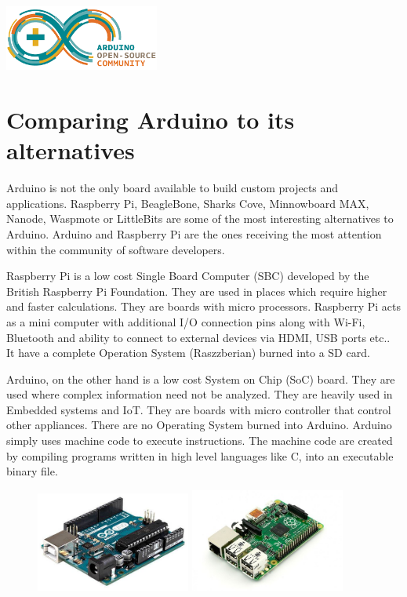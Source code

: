 \begin{marginfigure}
    \includegraphics[width=2in]{Chapters/images/Arduino_opensource.png}
\end{marginfigure}    

\section{Comparing Arduino to its alternatives
}
Arduino is not the only board available to build custom projects and applications. Raspberry Pi, BeagleBone, Sharks Cove, Minnowboard MAX, Nanode, Waspmote or LittleBits are some of the most interesting alternatives to Arduino. Arduino and Raspberry Pi are the ones receiving the most attention within the community of software developers.

Raspberry Pi is a low cost Single Board Computer (SBC) developed by the British Raspberry Pi Foundation. They are used in places which require higher and faster calculations. They are boards with micro processors. Raspberry Pi acts as a mini computer with additional I/O connection pins along with Wi-Fi, Bluetooth and ability to connect to external devices via HDMI, USB ports etc.. It have a complete Operation System (Raszzberian) burned into a SD card. 

Arduino, on the other hand is a low cost System on Chip (SoC) board. They are used where complex information need not be analyzed. They are heavily used in Embedded systems and IoT. They are boards with micro controller that control other appliances. There are no Operating System burned into Arduino. Arduino simply uses machine code to execute instructions. The machine code are created by compiling programs written in high level languages like C, into an executable binary file.
\begin{figure}
\begin{multicols}{2}
    \includegraphics[width=2in]{Chapters/images/Arduino_uno.png}\par
    \includegraphics[width=2in]{Chapters/images/raspeberry_modelb.jpg}
\end{multicols}
\end{figure}